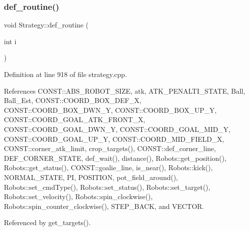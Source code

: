 \subsubsection{\texorpdfstring{def\+\_\+routine()}{def\_routine()}}
{\footnotesize\ttfamily void Strategy\+::def\+\_\+routine (\begin{DoxyParamCaption}\item[{int}]{i }\end{DoxyParamCaption})}



Definition at line 918 of file strategy.\+cpp.



References C\+O\+N\+S\+T\+::\+A\+B\+S\+\_\+\+R\+O\+B\+O\+T\+\_\+\+S\+I\+ZE, atk, A\+T\+K\+\_\+\+P\+E\+N\+A\+L\+T\+I\+\_\+\+S\+T\+A\+TE, Ball, Ball\+\_\+\+Est, C\+O\+N\+S\+T\+::\+C\+O\+O\+R\+D\+\_\+\+B\+O\+X\+\_\+\+D\+E\+F\+\_\+X, C\+O\+N\+S\+T\+::\+C\+O\+O\+R\+D\+\_\+\+B\+O\+X\+\_\+\+D\+W\+N\+\_\+Y, C\+O\+N\+S\+T\+::\+C\+O\+O\+R\+D\+\_\+\+B\+O\+X\+\_\+\+U\+P\+\_\+Y, C\+O\+N\+S\+T\+::\+C\+O\+O\+R\+D\+\_\+\+G\+O\+A\+L\+\_\+\+A\+T\+K\+\_\+\+F\+R\+O\+N\+T\+\_\+X, C\+O\+N\+S\+T\+::\+C\+O\+O\+R\+D\+\_\+\+G\+O\+A\+L\+\_\+\+D\+W\+N\+\_\+Y, C\+O\+N\+S\+T\+::\+C\+O\+O\+R\+D\+\_\+\+G\+O\+A\+L\+\_\+\+M\+I\+D\+\_\+Y, C\+O\+N\+S\+T\+::\+C\+O\+O\+R\+D\+\_\+\+G\+O\+A\+L\+\_\+\+U\+P\+\_\+Y, C\+O\+N\+S\+T\+::\+C\+O\+O\+R\+D\+\_\+\+M\+I\+D\+\_\+\+F\+I\+E\+L\+D\+\_\+X, C\+O\+N\+S\+T\+::corner\+\_\+atk\+\_\+limit, crop\+\_\+targets(), C\+O\+N\+S\+T\+::def\+\_\+corner\+\_\+line, D\+E\+F\+\_\+\+C\+O\+R\+N\+E\+R\+\_\+\+S\+T\+A\+TE, def\+\_\+wait(), distance(), Robots\+::get\+\_\+position(), Robots\+::get\+\_\+status(), C\+O\+N\+S\+T\+::goalie\+\_\+line, is\+\_\+near(), Robots\+::kick(), N\+O\+R\+M\+A\+L\+\_\+\+S\+T\+A\+TE, PI, P\+O\+S\+I\+T\+I\+ON, pot\+\_\+field\+\_\+around(), Robots\+::set\+\_\+cmd\+Type(), Robots\+::set\+\_\+status(), Robots\+::set\+\_\+target(), Robots\+::set\+\_\+velocity(), Robots\+::spin\+\_\+clockwise(), Robots\+::spin\+\_\+counter\+\_\+clockwise(), S\+T\+E\+P\+\_\+\+B\+A\+CK, and V\+E\+C\+T\+OR.



Referenced by get\+\_\+targets().


